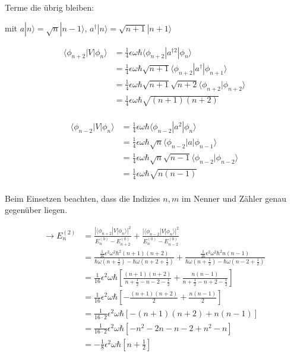 Terme die übrig bleiben:

mit \(a|n\rangle = \sqrt{n}|n-1\rangle\), \(a^\dagger|n\rangle = \sqrt{n+1}|n+1\rangle\)

\begin{align}
\langle \phi_{n+2}|V|\phi_n\rangle &=\frac{1}{4}\epsilon \omega\hbar \langle \phi_{n+2}|a^{\dagger 2}|\phi_n\rangle\\
&= \frac{1}{4}\epsilon \omega\hbar \sqrt{n+1} \langle \phi_{n+2}|a^{\dagger}|\phi_{n+1}\rangle\\
&=  \frac{1}{4}\epsilon \omega\hbar \sqrt{n+1} \sqrt{n+2} \langle \phi_{n+2}|\phi_{n+2}\rangle\\
&=  \frac{1}{4}\epsilon \omega\hbar \sqrt{(n+1)(n+2)} \\
\end{align}

\begin{align}
\langle \phi_{n-2}|V|\phi_n\rangle &=\frac{1}{4}\epsilon \omega\hbar \langle \phi_{n-2}|a^2|\phi_n\rangle\\
&= \frac{1}{4}\epsilon \omega\hbar \sqrt{n} \langle \phi_{n-2}|a|\phi_{n-1}\rangle\\
&=  \frac{1}{4}\epsilon \omega\hbar \sqrt{n} \sqrt{n-1} \langle \phi_{n-2}|\phi_{n-2}\rangle\\
&=  \frac{1}{4}\epsilon \omega\hbar \sqrt{n(n-1)} \\
\end{align}

Beim Einsetzen beachten, dass die Indizies \(n,m\) im Nenner und Zähler genau gegenüber liegen.

\begin{align}
\rightarrow E^{(2)}_n &= \frac{|\langle \phi_{n+2}|V|\phi_n\rangle|^2}{E^{(0)}_n-E^{(0)}_{n+2}} + \frac{|\langle \phi_{n-2}|V|\phi_n\rangle|^2}{E^{(0)}_n-E^{(0)}_{n-2}}\\
&=\frac{\frac{1}{16}\epsilon^2 \omega^2\hbar^2 (n+1)(n+2)}{\hbar \omega(n+\frac{1}{2})-\hbar \omega(n+2+\frac{1}{2})} + \frac{\frac{1}{16}\epsilon^2 \omega^2\hbar^2 n(n-1)}{\hbar \omega(n+\frac{1}{2})-\hbar \omega(n-2+\frac{1}{2})}\\
&=\frac{1}{16}\epsilon^2 \omega\hbar \left[\frac{(n+1)(n+2)}{n+\frac{1}{2}-n-2-\frac{1}{2}} + \frac{n(n-1)}{n+\frac{1}{2}-n+2-\frac{1}{2}}\right]\\
&=\frac{1}{16}\epsilon^2 \omega\hbar \left[-\frac{(n+1)(n+2)}{2} + \frac{n(n-1)}{2}\right]\\
&=\frac{1}{16\cdot 2}\epsilon^2 \omega\hbar [-(n+1)(n+2) + n(n-1)]\\
&=\frac{1}{16\cdot 2}\epsilon^2 \omega\hbar [-n^2-2n-n-2 + n^2-n]\\
&=-\frac{1}{8}\epsilon^2 \omega\hbar [n+\frac{1}{2}]\\
\end{align}

